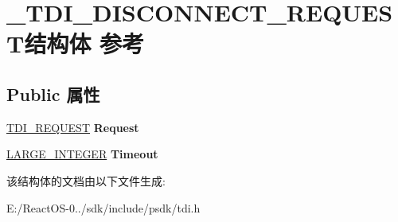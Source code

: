 \hypertarget{struct___t_d_i___d_i_s_c_o_n_n_e_c_t___r_e_q_u_e_s_t}{}\section{\+\_\+\+T\+D\+I\+\_\+\+D\+I\+S\+C\+O\+N\+N\+E\+C\+T\+\_\+\+R\+E\+Q\+U\+E\+S\+T结构体 参考}
\label{struct___t_d_i___d_i_s_c_o_n_n_e_c_t___r_e_q_u_e_s_t}
\subsection*{Public 属性}
\begin{DoxyCompactItemize}
\item 
\mbox{\label{struct___t_d_i___d_i_s_c_o_n_n_e_c_t___r_e_q_u_e_s_t_a8d3ef6c4029be72e98e75ca3bf4cd9fc}} 
\hyperlink{struct___t_d_i___r_e_q_u_e_s_t}{T\+D\+I\+\_\+\+R\+E\+Q\+U\+E\+ST} {\bfseries Request}
\item 
\mbox{\label{struct___t_d_i___d_i_s_c_o_n_n_e_c_t___r_e_q_u_e_s_t_acd3dc4fdd7fcf3f4898df013acd4bb00}} 
\hyperlink{union___l_a_r_g_e___i_n_t_e_g_e_r}{L\+A\+R\+G\+E\+\_\+\+I\+N\+T\+E\+G\+ER} {\bfseries Timeout}
\end{DoxyCompactItemize}


该结构体的文档由以下文件生成\+:\begin{DoxyCompactItemize}
\item 
E\+:/\+React\+O\+S-\/0../sdk/include/psdk/tdi.\+h\end{DoxyCompactItemize}
